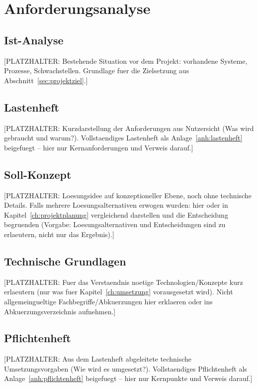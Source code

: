 \chapter{Anforderungsanalyse}
\label{ch:anforderungsanalyse}

\section{Ist-Analyse}
[PLATZHALTER: Bestehende Situation vor dem Projekt: vorhandene Systeme,
Prozesse, Schwachstellen. Grundlage fuer die Zielsetzung aus
Abschnitt~\ref{sec:projektziel}.]

\section{Lastenheft}
\label{sec:lastenheft}
[PLATZHALTER: Kurzdarstellung der Anforderungen aus Nutzersicht (Was wird
gebraucht und warum?). Vollstaendiges Lastenheft als
Anlage~\ref{anh:lastenheft} beigefuegt -- hier nur Kernanforderungen und
Verweis darauf.]

\section{Soll-Konzept}
[PLATZHALTER: Loesungsidee auf konzeptioneller Ebene, noch ohne technische
Details. Falls mehrere Loesungsalternativen erwogen wurden: hier oder in
Kapitel~\ref{ch:projektplanung} vergleichend darstellen und die Entscheidung
begruenden (Vorgabe: Loesungsalternativen und Entscheidungen sind zu
erlaeutern, nicht nur das Ergebnis).]

\section{Technische Grundlagen}
[PLATZHALTER: Fuer das Verstaendnis noetige Technologien/Konzepte kurz
erlaeutern (nur was fuer Kapitel~\ref{ch:umsetzung} vorausgesetzt wird).
Nicht allgemeingueltige Fachbegriffe/Abkuerzungen hier erklaeren oder ins
Abkuerzungsverzeichnis aufnehmen.]

\section{Pflichtenheft}
\label{sec:pflichtenheft}
[PLATZHALTER: Aus dem Lastenheft abgeleitete technische Umsetzungsvorgaben
(Wie wird es umgesetzt?). Vollstaendiges Pflichtenheft als
Anlage~\ref{anh:pflichtenheft} beigefuegt -- hier nur Kernpunkte und Verweis
darauf.]
